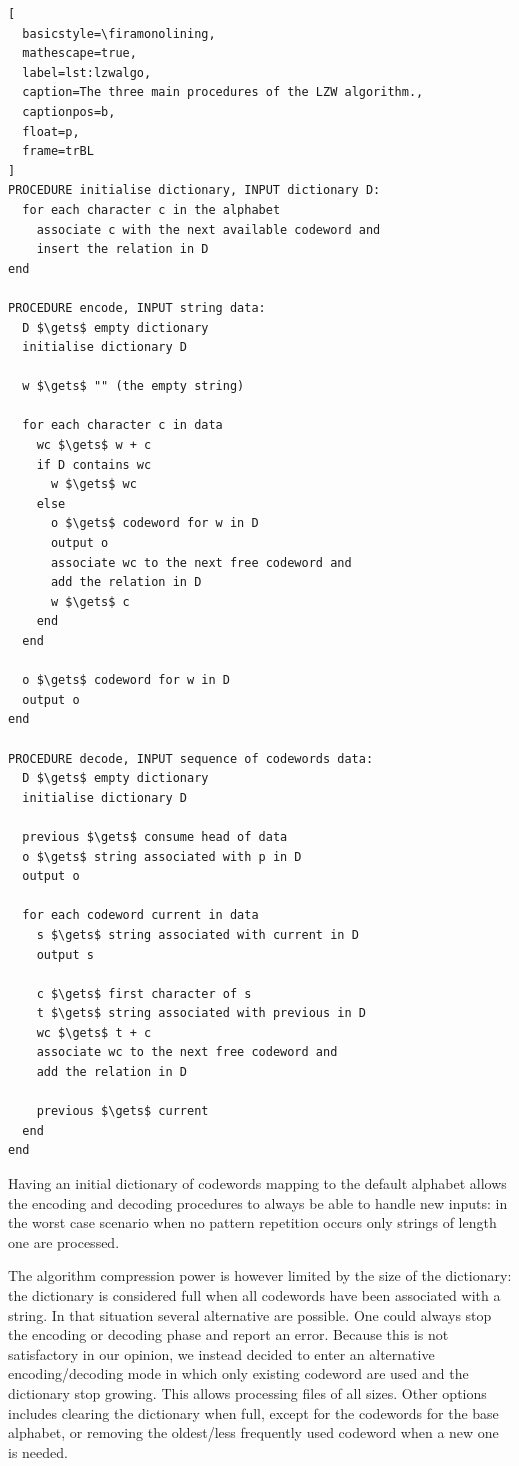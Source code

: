 \documentclass[a4paper,twoside]{article}
\begin{document}
\begin{lstlisting}[
  basicstyle=\firamonolining,
  mathescape=true,
  label=lst:lzwalgo,
  caption=The three main procedures of the LZW algorithm.,
  captionpos=b,
  float=p,
  frame=trBL
]
PROCEDURE initialise dictionary, INPUT dictionary D:
  for each character c in the alphabet
    associate c with the next available codeword and
    insert the relation in D
end

PROCEDURE encode, INPUT string data:
  D $\gets$ empty dictionary
  initialise dictionary D

  w $\gets$ "" (the empty string)

  for each character c in data
    wc $\gets$ w + c
    if D contains wc
      w $\gets$ wc
    else
      o $\gets$ codeword for w in D
      output o
      associate wc to the next free codeword and
      add the relation in D
      w $\gets$ c
    end
  end

  o $\gets$ codeword for w in D
  output o
end

PROCEDURE decode, INPUT sequence of codewords data:
  D $\gets$ empty dictionary
  initialise dictionary D

  previous $\gets$ consume head of data
  o $\gets$ string associated with p in D
  output o

  for each codeword current in data
    s $\gets$ string associated with current in D
    output s

    c $\gets$ first character of s
    t $\gets$ string associated with previous in D
    wc $\gets$ t + c
    associate wc to the next free codeword and
    add the relation in D

    previous $\gets$ current
  end
end
\end{lstlisting}

Having an initial dictionary of codewords mapping to the default alphabet allows
the encoding and decoding procedures to always be able to handle new inputs: in
the worst case scenario when no pattern repetition occurs only strings of length
one are processed.

The algorithm compression power is however limited by the size of the
dictionary: the dictionary is considered full when all codewords have been
associated with a string. In that situation several alternative are possible.
One could always stop the encoding or decoding phase and report an error.
Because this is not satisfactory in our opinion, we instead decided to enter an
alternative encoding/decoding mode in which only existing codeword are used and
the dictionary stop growing. This allows processing files of all sizes. Other
options includes clearing the dictionary when full, except for the codewords for
the base alphabet, or removing the oldest/less frequently used codeword when a
new one is needed.
\end{document}
